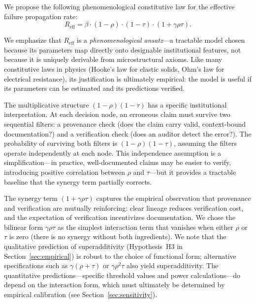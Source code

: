 \documentclass[runningheads]{llncs}
\begin{document}
We propose the following phenomenological constitutive law for the effective failure propagation rate:
\begin{equation}
R_{\mathrm{eff}} = \beta \cdot (1-\rho) \cdot (1-\tau) \cdot (1+\gamma \rho \tau).
\label{eq:reff}
\end{equation}

We emphasize that $R_{\mathrm{eff}}$ is a \emph{phenomenological ansatz}---a tractable model chosen because its parameters map directly onto designable institutional features, not because it is uniquely derivable from microstructural axioms. Like many constitutive laws in physics (Hooke's law for elastic solids, Ohm's law for electrical resistance), its justification is ultimately empirical: the model is useful if its parameters can be estimated and its predictions verified.

The multiplicative structure $(1-\rho)(1-\tau)$ has a specific institutional interpretation. At each decision node, an erroneous claim must survive two sequential filters: a provenance check (does the claim carry valid, context-bound documentation?) and a verification check (does an auditor detect the error?). The probability of surviving both filters is $(1-\rho)(1-\tau)$, assuming the filters operate independently at each node. This independence assumption is a simplification---in practice, well-documented claims may be easier to verify, introducing positive correlation between $\rho$ and $\tau$---but it provides a tractable baseline that the synergy term partially corrects.

The synergy term $(1+\gamma\rho\tau)$ captures the empirical observation that provenance and verification are mutually reinforcing: clear lineage reduces verification cost, and the expectation of verification incentivizes documentation. We chose the bilinear form $\gamma\rho\tau$ as the simplest interaction term that vanishes when either $\rho$ or $\tau$ is zero (there is no synergy without both ingredients). We note that the qualitative prediction of superadditivity (Hypothesis~H3 in Section~\ref{sec:empirical}) is robust to the choice of functional form; alternative specifications such as $\gamma(\rho+\tau)$ or $\gamma\rho^2\tau$ also yield superadditivity. The quantitative predictions---specific threshold values and power calculations---do depend on the interaction form, which must ultimately be determined by empirical calibration (see Section~\ref{sec:sensitivity}).
\end{document}
